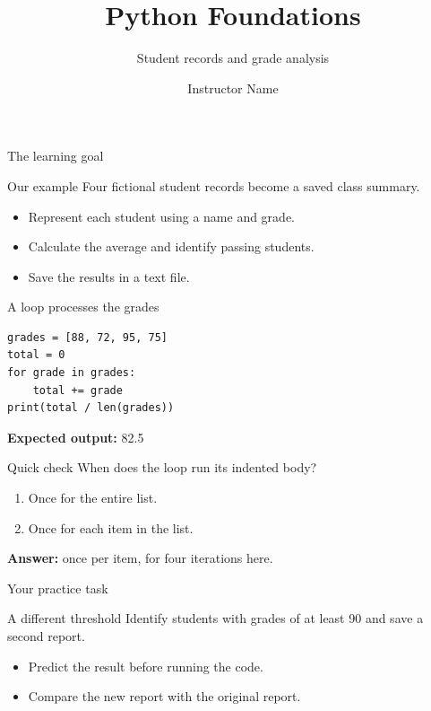 \documentclass[aspectratio=169,12pt]{beamer}
\title{Python Foundations}
\subtitle{Student records and grade analysis}
\author{Instructor Name}
\institute{De La Salle University\\College of Computer Studies}
\date{}
\begin{document}
\begin{frame}[plain]\titlepage\end{frame}
\begin{frame}{The learning goal}
\begin{block}{Our example}
Four fictional student records become a saved class summary.
\end{block}
\begin{itemize}
\item Represent each student using a name and grade.
\item Calculate the average and identify passing students.
\item Save the results in a text file.
\end{itemize}
\end{frame}
\begin{frame}[fragile]{A loop processes the grades}
\begin{lstlisting}
grades = [88, 72, 95, 75]
total = 0
for grade in grades:
    total += grade
print(total / len(grades))
\end{lstlisting}
\textbf{Expected output:} 82.5
\end{frame}
\begin{frame}{Quick check}
When does the loop run its indented body?
\begin{enumerate}
\item Once for the entire list.
\item Once for each item in the list.
\end{enumerate}
\medskip
\textbf{Answer:} once per item, for four iterations here.
\end{frame}
\begin{frame}{Your practice task}
\begin{block}{A different threshold}
Identify students with grades of at least 90 and save a second report.
\end{block}
\begin{itemize}
\item Predict the result before running the code.
\item Compare the new report with the original report.
\end{itemize}
\end{frame}
\end{document}
